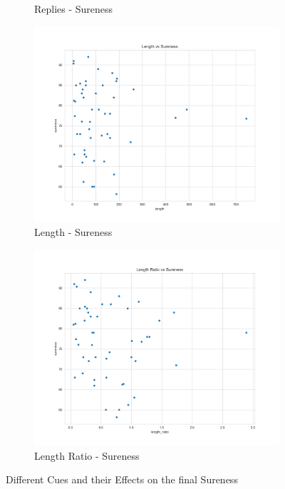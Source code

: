 \documentclass[11pt, oneside]{article}   	%
\begin{document}
\begin{figure}[H]
\begin{subfigure}{.5\textwidth}
  \caption{Replies - Sureness}
\end{subfigure}
\begin{subfigure}{.5\textwidth}
  \centering
  \includegraphics[width=\linewidth]{../plots/full_data/length_vs_sureness}
  \caption{Length - Sureness}
\end{subfigure}%
\begin{subfigure}{.5\textwidth}
  \centering
  \includegraphics[width=\linewidth]{../plots/full_data/length_ratio_vs_sureness}
  \caption{Length Ratio - Sureness}
\end{subfigure}
\caption{Different Cues and their Effects on the final Sureness}
\end{figure}
\end{document}
